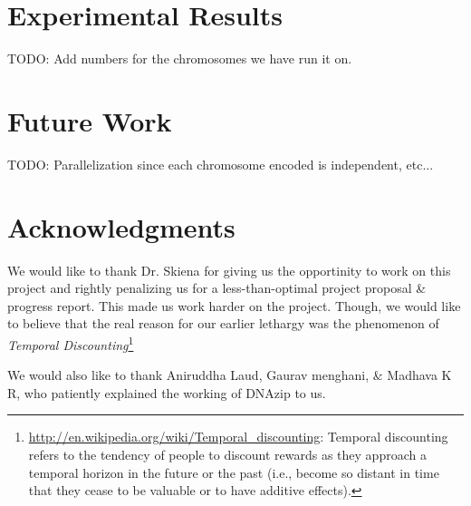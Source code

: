 \documentclass[11pt]{article}
\begin{document}
\section{Experimental Results}

TODO: Add numbers for the chromosomes we have run it on.

\section{Future Work}

TODO: Parallelization since each chromosome encoded is independent,
etc...

\section{Acknowledgments}

We would like to thank Dr. Skiena for giving us the opportinity to
work on this project and rightly penalizing us for a less-than-optimal
project proposal \& progress report. This made us work harder on the
project. Though, we would like to believe that the real reason for our
earlier lethargy was the phenomenon of \textit{Temporal
  Discounting}\footnote{\url{http://en.wikipedia.org/wiki/Temporal_discounting}:
  Temporal discounting refers to the tendency of people to discount
  rewards as they approach a temporal horizon in the future or the
  past (i.e., become so distant in time that they cease to be valuable
  or to have additive effects).}

We would also like to thank Aniruddha Laud, Gaurav menghani, \&
Madhava K R, who patiently explained the working of
DNAzip\cite{dnazip} to us.



\clearpage
\end{document}
